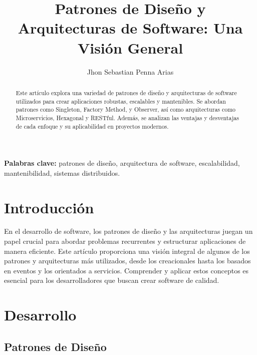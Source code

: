 \documentclass{article}
\title{Patrones de Diseño y Arquitecturas de Software: Una Visión General}
\author{Jhon Sebastian Penna Arias}
\date{}
\begin{document}
\maketitle

\begin{abstract}
Este artículo explora una variedad de patrones de diseño y arquitecturas de software utilizados para crear aplicaciones robustas, escalables y mantenibles. Se abordan patrones como Singleton, Factory Method, y Observer, así como arquitecturas como Microservicios, Hexagonal y RESTful. Además, se analizan las ventajas y desventajas de cada enfoque y su aplicabilidad en proyectos modernos.
\end{abstract}

\textbf{Palabras clave:} patrones de diseño, arquitectura de software, escalabilidad, mantenibilidad, sistemas distribuidos.

\section{Introducción}
En el desarrollo de software, los patrones de diseño y las arquitecturas juegan un papel crucial para abordar problemas recurrentes y estructurar aplicaciones de manera eficiente. Este artículo proporciona una visión integral de algunos de los patrones y arquitecturas más utilizados, desde los creacionales hasta los basados en eventos y los orientados a servicios. Comprender y aplicar estos conceptos es esencial para los desarrolladores que buscan crear software de calidad.

\section{Desarrollo}

\subsection{Patrones de Diseño}
\end{document}

